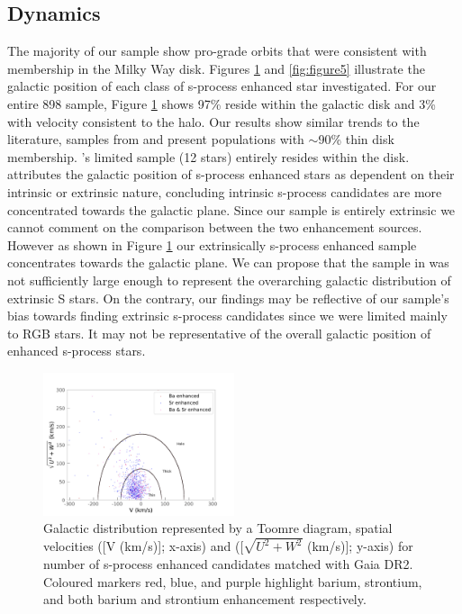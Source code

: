 \documentclass[a4paper,fleqn,usenatbib]{mnras}
\begin{document}
\subsection{Dynamics}

The majority of our sample show pro-grade orbits that were consistent with membership in the Milky Way disk. Figures \ref{fig:figure4} and \ref{fig:figure5} illustrate the galactic position of each class of s-process enhanced star investigated. For our entire 898 sample, Figure \ref{fig:figure4} shows 97\% reside within the galactic disk  and 3\% with velocity consistent to the halo. Our results show similar trends to the literature, samples from \cite{gomez1997} and  
\cite{decastro2016} present populations with $\sim$90\% thin disk membership. \cite{pereira2011}’s limited sample (12 stars) entirely resides within the disk. \cite{jorissen1993} attributes the galactic position of s-process enhanced stars as dependent on their intrinsic or extrinsic nature, concluding intrinsic s-process candidates are more concentrated towards the galactic plane. Since our sample is entirely extrinsic we cannot comment on the comparison between the two enhancement sources. However as shown in Figure \ref{fig:figure4} our extrinsically s-process enhanced sample concentrates towards the galactic plane. We can propose that the sample in \cite{jorissen1993} was not sufficiently large enough to represent the overarching galactic distribution of extrinsic S stars. On the contrary, our findings may be reflective of our sample's bias towards finding extrinsic s-process candidates since we were limited mainly to RGB stars. It may not be representative of the overall galactic position of enhanced s-process stars.  

\begin{figure}
	\includegraphics[width=0.5\textwidth]{toomre.pdf}
	\caption{Galactic distribution represented by a Toomre diagram, spatial velocities ([V (km/s)]; x-axis) and ([$\sqrt{U^2+W^2}$ (km/s)]; y-axis) for number of s-process enhanced candidates matched with Gaia DR2. Coloured markers red, blue, and purple highlight barium, strontium, and both barium and strontium enhancement respectively.}
	\label{fig:figure4}
\end{figure}
\end{document}
